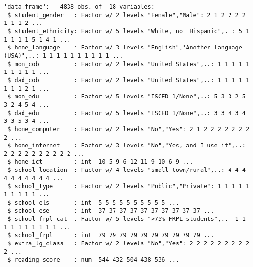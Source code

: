 \documentclass[
]{article}
\begin{document}
\begin{verbatim}
'data.frame':   4838 obs. of  18 variables:
 $ student_gender   : Factor w/ 2 levels "Female","Male": 2 1 2 2 2 2 1 1 1 2 ...
 $ student_ethnicity: Factor w/ 5 levels "White, not Hispanic",..: 5 1 1 1 1 1 5 1 4 1 ...
 $ home_language    : Factor w/ 3 levels "English","Another language (USA)",..: 1 1 1 1 1 1 1 1 1 1 ...
 $ mom_cob          : Factor w/ 2 levels "United States",..: 1 1 1 1 1 1 1 1 1 1 ...
 $ dad_cob          : Factor w/ 2 levels "United States",..: 1 1 1 1 1 1 1 1 2 1 ...
 $ mom_edu          : Factor w/ 5 levels "ISCED 1/None",..: 5 3 3 2 5 3 2 4 5 4 ...
 $ dad_edu          : Factor w/ 5 levels "ISCED 1/None",..: 3 3 4 3 4 3 3 5 3 4 ...
 $ home_computer    : Factor w/ 2 levels "No","Yes": 2 1 2 2 2 2 2 2 2 2 ...
 $ home_internet    : Factor w/ 3 levels "No","Yes, and I use it",..: 2 2 2 2 2 2 2 2 2 2 ...
 $ home_ict         : int  10 5 9 6 12 11 9 10 6 9 ...
 $ school_location  : Factor w/ 4 levels "small_town/rural",..: 4 4 4 4 4 4 4 4 4 4 ...
 $ school_type      : Factor w/ 2 levels "Public","Private": 1 1 1 1 1 1 1 1 1 1 ...
 $ school_els       : int  5 5 5 5 5 5 5 5 5 5 ...
 $ school_ese       : int  37 37 37 37 37 37 37 37 37 37 ...
 $ school_frpl_cat  : Factor w/ 5 levels ">75% FRPL students",..: 1 1 1 1 1 1 1 1 1 1 ...
 $ school_frpl      : int  79 79 79 79 79 79 79 79 79 79 ...
 $ extra_lg_class   : Factor w/ 2 levels "No","Yes": 2 2 2 2 2 2 2 2 2 2 ...
 $ reading_score    : num  544 432 504 438 536 ...
\end{verbatim}
\end{document}
